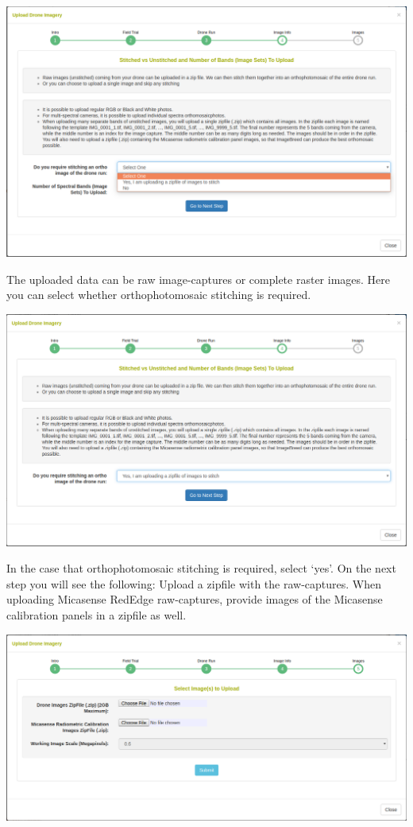 \documentclass[
  12pt,
]{book}
\begin{document}
\begin{center}\includegraphics[width=0.95\linewidth]{assets/images/manage_image_phenotyping_upload_image_info_1} \end{center}

The uploaded data can be raw image-captures or complete raster images. Here you can select whether orthophotomosaic stitching is required.

\begin{center}\includegraphics[width=0.95\linewidth]{assets/images/manage_image_phenotyping_upload_image_info_2} \end{center}

In the case that orthophotomosaic stitching is required, select `yes'. On the next step you will see the following: Upload a zipfile with the raw-captures. When uploading Micasense RedEdge raw-captures, provide images of the Micasense calibration panels in a zipfile as well.

\begin{center}\includegraphics[width=0.95\linewidth]{assets/images/manage_image_phenotyping_upload_images_zipfile} \end{center}
\end{document}
